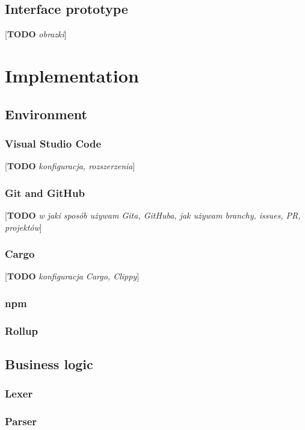 \documentclass[english,engineering]{wizthesis}
\newcommand{\todo}[1]{{\color{red}[\textbf{TODO} \textit{#1}]}}
\begin{document}
\section{Interface prototype}

\todo{obrazki}

\chapter{Implementation}

\section{Environment}

\subsection{Visual Studio Code}

\todo{konfiguracja, rozszerzenia}

\subsection{Git and GitHub}

\todo{w jaki sposób używam Gita, GitHuba, jak używam branchy, issues, PR,
projektów}

\subsection{Cargo}

\todo{konfiguracja Cargo, Clippy}

\subsection{npm}

\subsection{Rollup}

\section{Business logic}

\subsection{Lexer}

\subsection{Parser}
\end{document}
